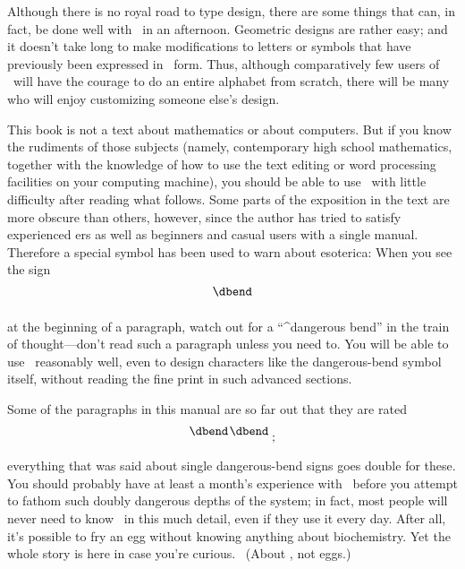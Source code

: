 {Although there is no royal road to type design, there are some things that
can, in fact, be done well with \MF\ in an afternoon. Geometric designs
are rather easy; and it doesn't take long to make modifications to letters
or symbols that have previously been expressed in \MF\ form. Thus,
although comparatively few users of \MF\ will have the courage to do an
entire alphabet from scratch, there will be many who will enjoy
customizing someone else's design.

This book is not a text about mathematics or about computers. But if
you know the rudiments of those subjects (namely, contemporary high school
mathematics, together with the knowledge of how to use the text
editing or word processing facilities on your computing machine),
you should be able to use \MF\ with little difficulty after reading
what follows. Some parts of the exposition in the text are more obscure
than others, however, since the author has tried to satisfy experienced
\MF ers as well as beginners and casual users with a single manual.
Therefore a special symbol has been used to warn about esoterica: When you
see the sign
$$\vbox{\hbox{\dbend}\vskip 11pt}$$
at the beginning of a paragraph, watch out for a ``^{dangerous bend}''
in the train of thought---don't read such a paragraph unless you need to.
You will be able to use \MF\ reasonably well, even to design characters like
the dangerous-bend symbol itself, without reading the fine print in such
advanced sections.

Some of the paragraphs in this manual are so far out that they are rated
$$\vcenter{\hbox{\dbend\kern1pt\dbend}\vskip 11pt}\;;$$
everything that was said about single dangerous-bend signs goes double
for these. You should probably have at least a month's experience with
\MF\ before you attempt to fathom such doubly dangerous depths
of the system; in fact, most people will never need to know \MF\
in this much detail, even if they use it every day. After all, it's
possible to fry an egg without knowing anything about biochemistry.
Yet the whole story is here in case you're curious. \ (About \MF\!, not eggs.)

}
